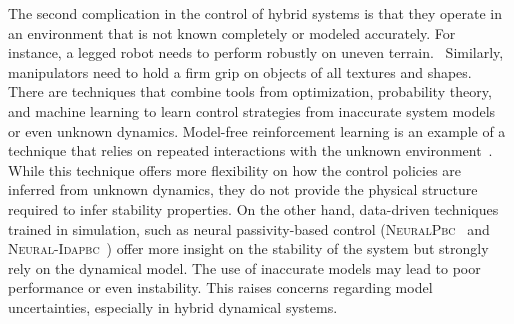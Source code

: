 The second complication in the control of hybrid systems is that they operate in
an environment that is not known completely or modeled accurately.
%
For instance, a legged robot needs to perform robustly on uneven
terrain.~
Similarly, manipulators need to hold a firm grip on objects of all textures and
shapes.
%
There are techniques that combine tools from optimization, probability theory,
and machine learning to learn control strategies from inaccurate system models
or even unknown dynamics.
%
Model-free reinforcement learning is an example of a technique that relies on
repeated interactions with the unknown
environment~\cite{heess2017emergence,andrychowicz2020learning,lillicrap2015continuous}.
%
While this technique offers more flexibility on how the control policies are
inferred from unknown dynamics, they do not provide the physical structure
required to infer stability properties.
%
On the other hand, data-driven techniques trained in simulation, such as neural
passivity-based control (\textsc{NeuralPbc}~\cite{ashenafi2022robust} and
\textsc{Neural-Idapbc}~\cite{sirichotiyakul2022data}) offer more insight on the stability
of the system but strongly rely on the dynamical model.
%
The use of inaccurate models may lead to poor performance or even instability.
%
This raises concerns regarding model uncertainties, especially in hybrid dynamical
systems.~
%

